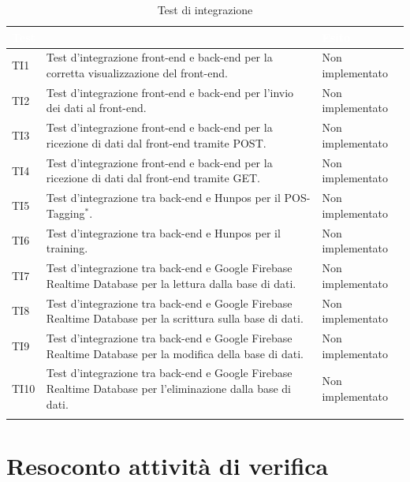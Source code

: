 	\begin{longtable}{|>{\centering\arraybackslash}m{1.6cm}|>{\centering\arraybackslash}m{6.41cm}|>{\centering\arraybackslash}m{3.1cm}|}		
		\rowcolor{LightBlue}
		\textbf{\textcolor{white}{Test}}
		& \multicolumn{1}{|c|}{\textbf{\textcolor{white}{ Descrizione}}}
		& \textbf{\textcolor{white}{Esito}}\\
		\hline
		TI1
		& Test d’integrazione front-end e back-end per la corretta visualizzazione del front-end.
		& Non implementato
		\\ \hline
		\rowcolor{LightGray}
		TI2
		& Test d’integrazione front-end e back-end per l'invio dei dati al front-end.
		& Non implementato
		\\ \hline
		TI3
		& Test d’integrazione front-end e back-end per la ricezione di dati dal front-end tramite POST.
		& Non implementato
		\\ \hline
		\rowcolor{LightGray}
		TI4
		& Test d’integrazione front-end e back-end per la ricezione di dati dal front-end tramite GET.
		& Non implementato
		\\ \hline
		TI5
		& Test d’integrazione tra back-end e Hunpos per il POS-Tagging$^*$.
		& Non implementato
		\\ \hline
		\rowcolor{LightGray}
		TI6
		& Test d’integrazione tra back-end e Hunpos per il training.
		& Non implementato
		\\ \hline	
		TI7
		& Test d’integrazione tra back-end e Google Firebase Realtime Database per la lettura dalla base di dati.
		& Non implementato
		\\ \hline	
		\rowcolor{LightGray}
		TI8
		& Test d’integrazione tra back-end e Google Firebase Realtime Database per la scrittura sulla base di dati.
		& Non implementato
		\\ \hline	
		TI9
		& Test d’integrazione tra back-end e Google Firebase Realtime Database per la modifica della base di dati.
		& Non implementato
		\\ \hline	
		\rowcolor{LightGray}
		TI10
		& Test d’integrazione tra back-end e Google Firebase Realtime Database per l'eliminazione dalla base di dati.
		& Non implementato
		\\ \hline	
		\caption{Test di integrazione}
\end{longtable}


	
\newpage
\section{Resoconto attività di verifica}
